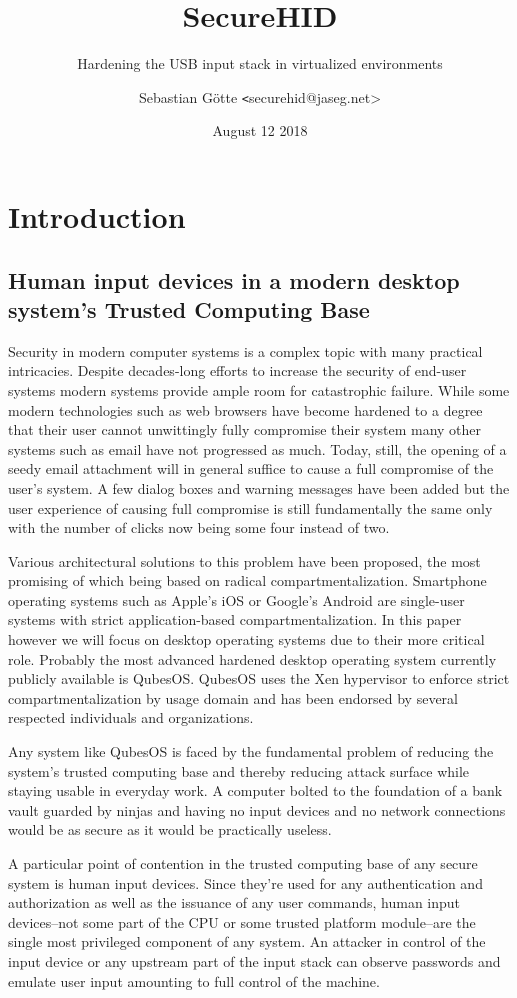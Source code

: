 \documentclass[12pt,a4paper,notitlepage]{article}
\author{Sebastian Götte {\texttt<securehid@jaseg.net>}}
\title{SecureHID}
\subtitle{Hardening the USB input stack in virtualized environments}
\date{August 12 2018}
\begin{document}
\maketitle

\section{Introduction}
\subsection{Human input devices in a modern desktop system's Trusted Computing Base}
Security in modern computer systems is a complex topic with many practical intricacies. Despite decades-long efforts to
increase the security of end-user systems modern systems provide ample room for catastrophic failure. While some modern
technologies such as web browsers have become hardened to a degree that their user cannot unwittingly fully compromise
their system many other systems such as email have not progressed as much. Today, still, the opening of a seedy email
attachment will in general suffice to cause a full compromise of the user's system. A few dialog boxes and warning
messages have been added but the user experience of causing full compromise is still fundamentally the same only with
the number of clicks now being some four instead of two.

Various architectural solutions to this problem have been proposed, the most promising of which being based on radical
compartmentalization. Smartphone operating systems such as Apple's iOS or Google's Android are single-user systems with
strict application-based compartmentalization. In this paper however we will focus on desktop operating systems due to
their more critical role. Probably the most advanced hardened desktop operating system currently publicly available is
QubesOS. QubesOS uses the Xen hypervisor to enforce strict compartmentalization by usage domain and has been endorsed by
several respected individuals and organizations.

Any system like QubesOS is faced by the fundamental problem of reducing the system's trusted computing base and thereby
reducing attack surface while staying usable in everyday work. A computer bolted to the foundation of a bank vault
guarded by ninjas and having no input devices and no network connections would be as secure as it would be practically
useless.

A particular point of contention in the trusted computing base of any secure system is human input devices. Since
they're used for any authentication and authorization as well as the issuance of any user commands, human input
devices--not some part of the CPU or some trusted platform module--are the single most privileged component of any
system. An attacker in control of the input device or any upstream part of the input stack can observe passwords and
emulate user input amounting to full control of the machine.
\end{document}
